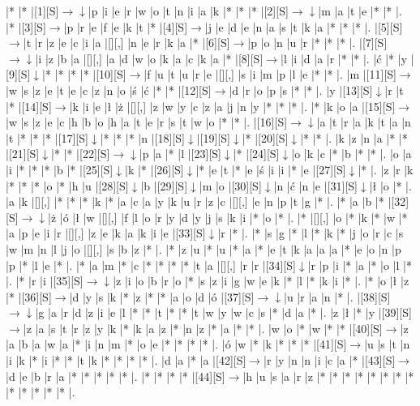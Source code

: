 \documentclass[11pt]{article}
\newcommand\drarr{$\rightarrow \!\!\!\!\! \downarrow$}
\newcommand\rarr{$\rightarrow$}
\newcommand\darr{$\downarrow$}
\begin{document}
\noindent\begin{Puzzle}{23}{25}|*	|*	|[1][S]\drarr	|p	|i	|e	|r	|w	|o	|t	|n	|i	|a	|k	|*	|*	|*	|[2][S]\drarr	|m	|a	|t	|e	|*	|*	|.
|*	|[3][S]\rarr	|p	|r	|e	|f	|e	|k	|t	|*	|[4][S]\rarr	|j	|e	|d	|e	|n	|a	|s	|t	|k	|a	|*	|*	|*	|.
|[5][S]\rarr	|t	|r	|z	|e	|c	|i	|a	|[][,]{ }	|n	|e	|r	|k	|a	|*	|[6][S]\rarr	|p	|o	|n	|u	|r	|*	|*	|*	|.
|[7][S]\drarr	|i	|z	|b	|a	|[][,]{ }	|a	|d	|w	|o	|k	|a	|c	|k	|a	|*	|[8][S]\rarr	|l	|i	|d	|a	|r	|*	|*	|.
|ć	|*	|y	|[9][S]\darr	|*	|*	|*	|*	|[10][S]\rarr	|f	|u	|t	|u	|r	|e	|[][,]{ }	|s	|i	|m	|p	|l	|e	|*	|*	|.
|m	|[11][S]\rarr	|w	|s	|z	|e	|t	|e	|c	|z	|n	|o	|ś	|ć	|*	|*	|[12][S]\rarr	|d	|r	|o	|p	|s	|*	|*	|.
|y	|[13][S]\darr	|r	|t	|*	|[14][S]\rarr	|k	|i	|e	|ł	|ż	|[][,]{ }	|z	|w	|y	|c	|z	|a	|j	|n	|y	|*	|*	|*	|.
|*	|k	|o	|a	|[15][S]\rarr	|w	|s	|z	|e	|c	|h	|b	|o	|h	|a	|t	|e	|r	|s	|t	|w	|o	|*	|*	|.
|[16][S]\drarr	|a	|t	|r	|a	|k	|t	|a	|n	|t	|*	|*	|*	|[17][S]\darr	|*	|*	|*	|n	|[18][S]\darr	|[19][S]\darr	|*	|[20][S]\darr	|*	|*	|.
|k	|z	|n	|a	|*	|*	|[21][S]\darr	|*	|*	|[22][S]\drarr	|p	|a	|*	|l	|[23][S]\darr	|*	|[24][S]\darr	|o	|k	|c	|*	|b	|*	|*	|.
|o	|a	|i	|*	|*	|*	|b	|*	|[25][S]\darr	|k	|*	|[26][S]\darr	|*	|e	|t	|*	|e	|ś	|i	|i	|*	|e	|[27][S]\darr	|*	|.
|z	|r	|k	|*	|*	|*	|o	|*	|h	|u	|[28][S]\darr	|b	|[29][S]\darr	|m	|o	|[30][S]\darr	|n	|ć	|n	|e	|[31][S]\darr	|ł	|o	|*	|.
|a	|k	|[][,]{ }	|*	|*	|*	|k	|*	|a	|c	|a	|y	|k	|u	|r	|z	|c	|[][,]{ }	|e	|n	|p	|t	|g	|*	|.
|*	|a	|b	|*	|[32][S]\drarr	|ż	|ó	|ł	|w	|[][,]{ }	|f	|l	|o	|r	|y	|d	|y	|j	|s	|k	|i	|*	|o	|*	|.
|*	|[][,]{ }	|o	|*	|k	|*	|w	|*	|a	|p	|e	|i	|r	|[][,]{ }	|z	|e	|k	|a	|k	|i	|e	|[33][S]\darr	|r	|*	|.
|*	|s	|g	|*	|l	|*	|k	|*	|j	|o	|r	|c	|s	|w	|m	|n	|l	|j	|o	|[][,]{ }	|s	|b	|z	|*	|.
|*	|z	|u	|*	|u	|*	|a	|*	|e	|t	|k	|a	|a	|a	|*	|e	|o	|n	|p	|p	|*	|l	|e	|*	|.
|*	|a	|m	|*	|c	|*	|*	|*	|*	|t	|a	|[][,]{ }	|r	|r	|[34][S]\darr	|r	|p	|i	|*	|a	|*	|o	|l	|*	|.
|*	|r	|i	|[35][S]\drarr	|z	|i	|o	|b	|r	|o	|*	|s	|z	|i	|g	|w	|e	|k	|*	|l	|*	|k	|i	|*	|.
|*	|o	|ł	|z	|*	|[36][S]\rarr	|d	|y	|s	|k	|*	|z	|*	|*	|a	|o	|d	|ó	|[37][S]\drarr	|u	|r	|a	|n	|*	|.
|[38][S]\drarr	|g	|a	|r	|d	|z	|i	|e	|l	|*	|*	|t	|*	|*	|t	|w	|y	|w	|c	|s	|*	|d	|a	|*	|.
|z	|ł	|*	|y	|[39][S]\rarr	|z	|a	|s	|t	|r	|z	|y	|k	|*	|k	|a	|z	|*	|n	|z	|*	|a	|*	|*	|.
|w	|o	|*	|w	|*	|*	|[40][S]\rarr	|z	|a	|b	|a	|w	|a	|*	|i	|n	|m	|*	|o	|e	|*	|*	|*	|*	|.
|ó	|w	|*	|k	|*	|*	|*	|[41][S]\rarr	|u	|s	|t	|n	|i	|k	|*	|i	|*	|*	|t	|k	|*	|*	|*	|*	|.
|d	|a	|*	|a	|[42][S]\rarr	|r	|y	|n	|n	|i	|c	|a	|*	|[43][S]\rarr	|d	|e	|b	|r	|a	|*	|*	|*	|*	|*	|.
|*	|*	|*	|*	|[44][S]\rarr	|h	|u	|s	|a	|r	|z	|*	|*	|*	|*	|*	|*	|*	|*	|*	|*	|*	|*	|*	|.\end{Puzzle}
\end{document}
